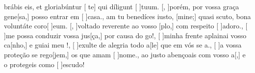 {  {brábis eis, et gloriabúntur [ te] qui díligunt [ ]{tu}um.}%
    {[, ]{po}rém, por vossa graça gene[sa,] posso entrar em [ ]{ca}sa.},
  {am tu benedíces iusto, [mine;] quasi scuto, bona voluntáte coro[ ]{e}um.}%
    {[, ]{vol}tado reverente ao vosso [plo,] com respeito [ ]{a}{do}ro.},
  {}%
    {[ ]{me} possa conduzir vossa jus[ça,] por causa do go!},
  {}%
    {[ ]{mi}nha frente aplainai vosso ca[nho,] e guiai meu !},
  {}%
    {[ ]{e}xulte de alegria todo a[le] que em vós se a.},
  {}%
    {[ ]{a} vossa proteção se rego[jem,] os que amam [ ]{no}me.},
  {}%
    { ao justo abençoais com vosso a[,] e o protegeis como [ ]{es}{cu}do!}
}